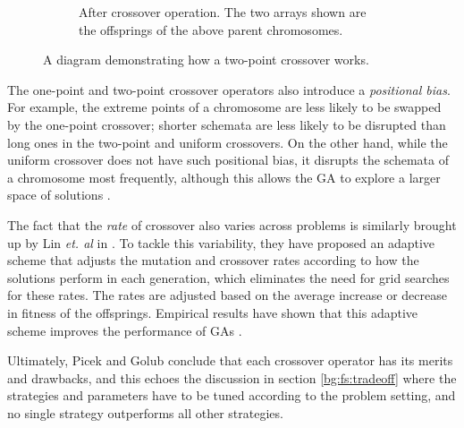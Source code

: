 \documentclass[12pt, twoside, a4paper]{report}
\begin{document}
\begin{figure}
\begin{subfigure}[b]{\textwidth}
\centering
{}
\caption{After crossover operation. The two arrays shown are the offsprings of the above parent chromosomes.}
\label{bg:ga:crossover_b}
\end{subfigure}
\caption{A diagram demonstrating how a two-point crossover works.}
\label{bg:ga:crossover}
\end{figure}


The one-point and two-point crossover operators also introduce a \textit{positional bias}. For example, the extreme points of a chromosome are less likely to be swapped by the one-point crossover; shorter schemata are less likely to be disrupted than long ones in the two-point and uniform crossovers. On the other hand, while the uniform crossover does not have such positional bias, it disrupts the schemata of a chromosome most frequently, although this allows the GA to explore a larger space of solutions \cite{RefWorks:224}.

The fact that the \textit{rate} of crossover also varies across problems is similarly brought up by Lin \textit{et. al} in \cite{RefWorks:225}. To tackle this variability, they have proposed an adaptive scheme that adjusts the mutation and crossover rates according to how the solutions perform in each generation, which eliminates the need for grid searches for these rates. The rates are adjusted based on the average increase or decrease in fitness of the offsprings. Empirical results have shown that this adaptive scheme improves the performance of GAs \cite{RefWorks:225, RefWorks:226}.

Ultimately, Picek and Golub conclude that each crossover operator has its merits and drawbacks, and this echoes the discussion in section \ref{bg:fs:tradeoff} where the strategies and parameters have to be tuned according to the problem setting, and no single strategy outperforms all other strategies.
\end{document}
